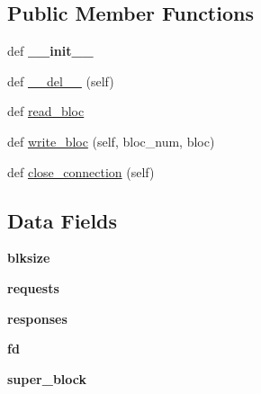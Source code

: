 \subsection*{Public Member Functions}
\begin{DoxyCompactItemize}
\item 
\hypertarget{classbloc__device_1_1remote__bloc__device_ac775ee34451fdfa742b318538164070e}{}def {\bfseries \+\_\+\+\_\+init\+\_\+\+\_\+}\label{classbloc__device_1_1remote__bloc__device_ac775ee34451fdfa742b318538164070e}

\item 
def \hyperlink{classbloc__device_1_1remote__bloc__device_a41a65d7030dd1006b177d0bc24e1a12b}{\+\_\+\+\_\+del\+\_\+\+\_\+} (self)
\item 
def \hyperlink{classbloc__device_1_1remote__bloc__device_ae8140b2e367967eee2d1e692e1fa09ee}{read\+\_\+bloc}
\item 
def \hyperlink{classbloc__device_1_1remote__bloc__device_a1ebddb0555944a72d7d252d13364b943}{write\+\_\+bloc} (self, bloc\+\_\+num, bloc)
\item 
def \hyperlink{classbloc__device_1_1remote__bloc__device_a000dc714be8532702febb6be755908dc}{close\+\_\+connection} (self)
\end{DoxyCompactItemize}
\subsection*{Data Fields}
\begin{DoxyCompactItemize}
\item 
\hypertarget{classbloc__device_1_1remote__bloc__device_a0fe38b9d912af78392a2e7156fbfc6e6}{}{\bfseries blksize}\label{classbloc__device_1_1remote__bloc__device_a0fe38b9d912af78392a2e7156fbfc6e6}

\item 
\hypertarget{classbloc__device_1_1remote__bloc__device_a796eb6fe3758085a1379a7a873e41fff}{}{\bfseries requests}\label{classbloc__device_1_1remote__bloc__device_a796eb6fe3758085a1379a7a873e41fff}

\item 
\hypertarget{classbloc__device_1_1remote__bloc__device_a7bfddf7ae6ce1b1321289f622d4b117e}{}{\bfseries responses}\label{classbloc__device_1_1remote__bloc__device_a7bfddf7ae6ce1b1321289f622d4b117e}

\item 
\hypertarget{classbloc__device_1_1remote__bloc__device_a44f21d5190b5a6df8089f54799628d7e}{}{\bfseries fd}\label{classbloc__device_1_1remote__bloc__device_a44f21d5190b5a6df8089f54799628d7e}

\item 
\hypertarget{classbloc__device_1_1remote__bloc__device_ade010e06fb5903346750389bafe241c2}{}{\bfseries super\+\_\+block}\label{classbloc__device_1_1remote__bloc__device_ade010e06fb5903346750389bafe241c2}

\end{DoxyCompactItemize}


